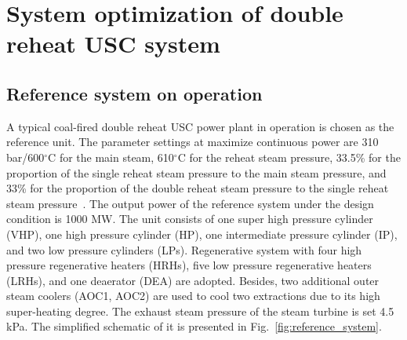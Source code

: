 \documentclass[preprint,12pt]{elsarticle}
\begin{document}
\section{System optimization of double reheat USC system}
\label{sec2:system intro}
\subsection{Reference system on operation} %
\label{sub2:ref intro}
A typical coal-fired double reheat USC power plant in operation is chosen as the reference unit.
The parameter settings at maximize continuous power are 310\,bar/600$^\circ$C for the main steam, 610$^\circ$C for the reheat steam pressure, 33.5\% for the proportion of the single reheat steam pressure to the main steam pressure, and 33\% for the proportion of the double reheat steam pressure to the single reheat steam pressure~\cite{Zhao2017Exergy}.
The output power of the reference system under the design condition is 1000 MW.
The unit consists of one super high pressure cylinder (VHP), one high pressure cylinder (HP), one intermediate pressure cylinder (IP), and two low pressure cylinders (LPs).
Regenerative system with four high pressure regenerative heaters (HRHs), five low pressure regenerative heaters (LRHs), and one deaerator (DEA) are adopted.
Besides, two additional outer steam coolers (AOC1, AOC2) are used to cool two extractions due to its high super-heating degree. The exhaust steam pressure of the steam turbine is set 4.5\,kPa. The simplified schematic of it is presented in Fig.~\ref{fig:reference_system}.
\end{document}

